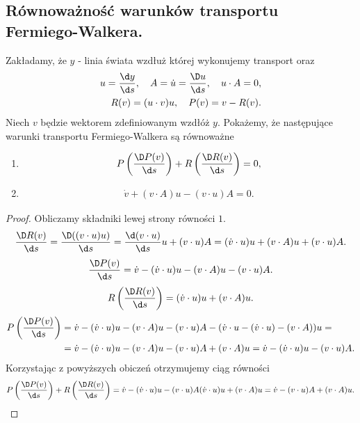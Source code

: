 \subsection{Równoważność warunków transportu 
Fermiego-Walkera.}
\noindent
Zakładamy, że $y$ - linia świata wzdłuż której 
wykonujemy transport oraz 
\begin{align*}
u = \frac{\d y}{\d s}, \quad A = \dot{u} = \frac{\D u}{\d s}, 
\quad u\cdot A = 0,\\
R(v) = (u\cdot v) u, \quad  P(v) = v - R(v).
\end{align*}
Niech $v$ będzie wektorem zdefiniowanym wzdłóż $y$. 
Pokażemy, że następujące warunki transportu Fermiego-Walkera są 
równoważne
\begin{enumerate}
\item
\begin{align*} 
P \left(\frac{\D P(v)}{\d s} \right) +
R \left( \frac{\D R(v)}{\d s} \right) =0,
\end{align*}
\item
\begin{align*} 
 \dot{v} +
(v\cdot A) u - (v\cdot u) A =0 .
\end{align*}
\end{enumerate}
\begin{proof}
Obliczamy składniki lewej strony równości $1$.
\begin{align*}
 \frac{\D R(v)}{\d s} = 
\frac{\D ((v\cdot u)u)}{\d s} =
\frac{\d (v\cdot u)}{\d s} u + (v\cdot u) A =
(\dot{v}\cdot u) u + (v\cdot A) u + (v\cdot u) A .
\end{align*}
\begin{align*}
\frac{\D P(v)}{\d s}  = 
 \dot{v} -(\dot{v}\cdot u) u - (v\cdot A) u - (v\cdot u) A .
\end{align*}
\begin{align*}
R \left( \frac{\D R(v)}{\d s} \right) =
(\dot{v}\cdot u) u + (v\cdot A) u .
\end{align*}
\begin{align*}
P \left(\frac{\D P(v)}{\d s} \right) &= 
 \dot{v} -
(\dot{v}\cdot u) u - (v\cdot A) u - (v\cdot u) A -
( \dot{v}\cdot u - (\dot{v}\cdot u)- (v\cdot A) )u = \\
&=
 \dot{v} -
(\dot{v}\cdot u) u - (v\cdot A) u - (v\cdot u) A 
+ (v\cdot A) u = 
 \dot{v} -
(\dot{v}\cdot u) u  - (v\cdot u) A .
\end{align*}
Korzystając z powyższych obiczeń otrzymujemy ciąg równości 
\begin{align*}
P \left(\frac{\D P(v)}{\d s} \right) +
R \left( \frac{\D R(v)}{\d s} \right) = 
 \dot{v} -
(\dot{v}\cdot u) u  - (v\cdot u) A 
(\dot{v}\cdot u) u + (v\cdot A) u  = 
 \dot{v} 
 - (v\cdot u) A 
 + (v\cdot A) u  .
\end{align*}

\end{proof}


